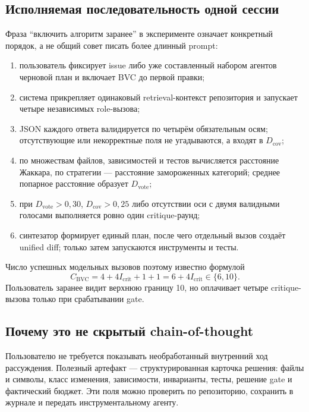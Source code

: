 \documentclass[11pt]{article}
\begin{document}
\subsection{Исполняемая последовательность одной сессии}

Фраза \enquote{включить алгоритм заранее} в эксперименте означает конкретный
порядок, а не общий совет писать более длинный prompt:
\begin{enumerate}
  \item пользователь фиксирует issue либо уже составленный набором агентов
        черновой план и включает BVC до первой правки;
  \item система прикрепляет одинаковый retrieval-контекст репозитория и
        запускает четыре независимых role-вызова;
  \item JSON каждого ответа валидируется по четырём обязательным осям;
        отсутствующие или некорректные поля не угадываются, а входят в
        \(D_{\mathrm{cov}}\);
  \item по множествам файлов, зависимостей и тестов вычисляется расстояние
        Жаккара, по стратегии --- расстояние замороженных категорий; среднее
        попарное расстояние образует \(D_{\mathrm{vote}}\);
  \item при \(D_{\mathrm{vote}}>0{,}30\), \(D_{\mathrm{cov}}>0{,}25\) либо
        отсутствии оси с двумя валидными голосами выполняется ровно один
        critique-раунд;
  \item синтезатор формирует единый план, после чего отдельный вызов создаёт
        unified diff; только затем запускаются инструменты и тесты.
\end{enumerate}

Число успешных модельных вызовов поэтому известно формулой
\[
C_{\mathrm{BVC}}=4+4I_{\mathrm{crit}}+1+1
=6+4I_{\mathrm{crit}}\in\{6,10\}.
\]
Пользователь заранее видит верхнюю границу 10, но оплачивает четыре
critique-вызова только при срабатывании gate.

\subsection{Почему это не скрытый chain-of-thought}

Пользователю не требуется показывать необработанный внутренний ход
рассуждения. Полезный артефакт --- структурированная карточка решения:
файлы и символы, класс изменения, зависимости, инварианты, тесты, решение
gate и фактический бюджет. Эти поля можно проверить по репозиторию, сохранить
в журнале и передать инструментальному агенту.
\end{document}
